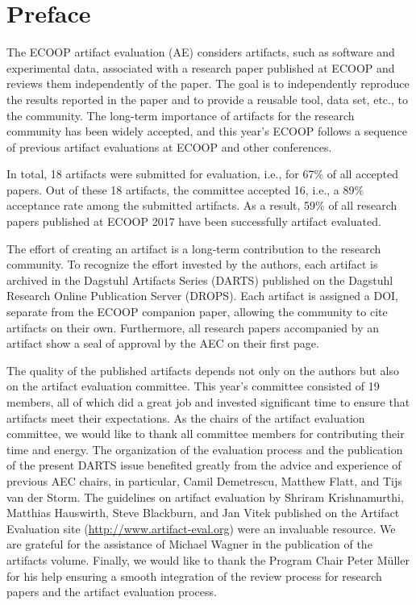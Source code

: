 \documentclass[a4paper,UKenglish]{dartsmaster}
\begin{document}
\chapter{Preface} %

The ECOOP artifact evaluation (AE) considers artifacts, such as software and
experimental data, associated with a research paper published at ECOOP and
reviews them independently of the paper. The goal is to independently
reproduce the results reported in the paper and to provide a reusable tool,
data set, etc., to the community. The long-term importance of artifacts for
the research community has been widely accepted, and this year's ECOOP
follows a sequence of previous artifact evaluations at ECOOP and other
conferences.

In total, 18 artifacts were submitted for evaluation, i.e., for 67\% of all
accepted papers. Out of these 18 artifacts, the committee accepted 16, i.e.,
a 89\% acceptance rate among the submitted artifacts. As a result, 59\% of
all research papers published at ECOOP 2017 have been successfully artifact
evaluated.

The effort of creating an artifact is a long-term contribution to the
research community. To recognize the effort invested by the authors, each
artifact is archived in the Dagstuhl Artifacts Series (DARTS) published on
the Dagstuhl Research Online Publication Server (DROPS). Each artifact is
assigned a DOI, separate from the ECOOP companion paper, allowing the
community to cite artifacts on their own. Furthermore, all research papers
accompanied by an artifact show a seal of approval by the AEC on their first
page.

The quality of the published artifacts depends not only on the authors but
also on the artifact evaluation committee. This year's committee consisted
of 19 members, all of which did a great job and invested significant time to
ensure that artifacts meet their expectations. As the chairs of the artifact
evaluation committee, we would like to thank all committee members for
contributing their time and energy. The organization of the evaluation
process and the publication of the present DARTS issue benefited
greatly from the advice and experience of previous AEC chairs, in
particular, Camil Demetrescu, Matthew Flatt, and Tijs van der Storm. The
guidelines on artifact evaluation by Shriram Krishnamurthi, Matthias
Hauswirth, Steve Blackburn, and Jan Vitek published on the Artifact
Evaluation site (\url{http://www.artifact-eval.org}) were an invaluable resource.
We are grateful for the assistance of Michael Wagner in the publication of
the artifacts volume. Finally, we would like to thank the Program Chair
Peter M{\"u}ller for his help ensuring a smooth integration of the review
process for research papers and the artifact evaluation process.
\end{document}
